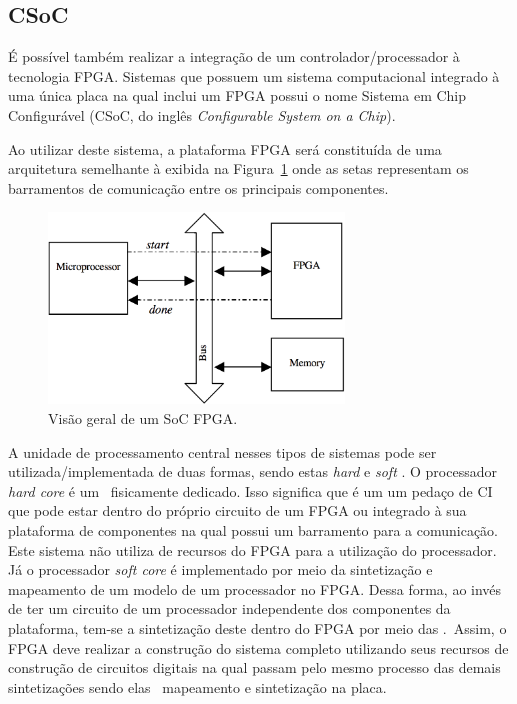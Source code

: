     
    
    \subsection{CSoC}
        É possível também realizar a integração de um controlador/processador à tecnologia FPGA.
        Sistemas que possuem um sistema computacional integrado à uma única placa na qual inclui um FPGA possui o nome Sistema em Chip Configurável (CSoC, do inglês \textit{Configurable System on a Chip}).
        
        Ao utilizar deste sistema, a plataforma FPGA será constituída de uma arquitetura semelhante à exibida na Figura~\ref{fig:rb-soc} onde as setas representam os barramentos de comunicação entre os principais componentes.
        
        \begin{figure}[h] \centering
            \includegraphics[width=0.7\textwidth]{img/into-soc.png}
            \caption{Visão geral de um SoC FPGA.}
            \label{fig:rb-soc}
        \end{figure}
    
    
        A unidade de processamento central nesses tipos de sistemas pode ser utilizada/implementada de duas formas, sendo estas \textit{hard} e \textit{soft} \cores.
        O processador \textit{hard core} é um \core\ fisicamente dedicado. Isso significa que é um um pedaço de CI que pode estar dentro do próprio circuito de um FPGA ou integrado à sua plataforma de componentes na qual possui um barramento para a comunicação.
        Este sistema não utiliza de recursos do FPGA para a utilização do processador.
        Já o processador \textit{soft core} é implementado por meio da sintetização e mapeamento de um modelo de um processador no FPGA.
        Dessa forma, ao invés de ter um circuito de um processador independente dos componentes da plataforma, tem-se a sintetização deste dentro do FPGA por meio das \luts.\ 
        Assim, o FPGA deve realizar a construção do sistema completo utilizando seus recursos de construção de circuitos digitais na qual passam pelo mesmo processo das demais sintetizações sendo elas \design\ mapeamento e sintetização na placa.
        
